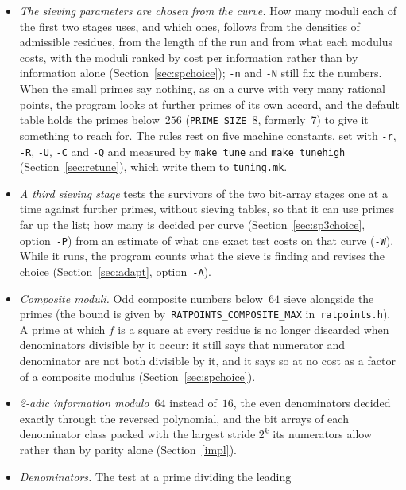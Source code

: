 \documentclass[12pt,a4paper,oneside]{amsart}
\begin{document}
\begin{itemize}
  \item \emph{The sieving parameters are chosen from the curve.} How many
        moduli each of the first two stages uses, and which ones, follows
        from the densities of admissible residues, from the length of the
        run and from what each modulus costs, with the moduli ranked by
        cost per information rather than by information alone
        (Section~\ref{sec:spchoice}); \verb+-n+ and \verb+-N+ still fix the
        numbers. When the small primes say nothing, as on a curve with very
        many rational points, the program looks at further primes of its
        own accord, and the default table holds the primes below~$256$
        (\texttt{PRIME\_SIZE}~8, formerly~7) to give it something to reach
        for. The rules rest on five machine constants, set with
        \verb+-r+, \verb+-R+, \verb+-U+, \verb+-C+ and \verb+-Q+ and
        measured by \texttt{make tune} and \texttt{make tunehigh}
        (Section~\ref{sec:retune}), which write them to \texttt{tuning.mk}.
  \item \emph{A third sieving stage} tests the survivors of the two
        bit-array stages one at a time against further primes, without
        sieving tables, so that it can use primes far up the list; how many
        is decided per curve (Section~\ref{sec:sp3choice}, option~\verb+-P+)
        from an estimate of what one exact test costs on that curve
        (\verb+-W+). While it runs, the program counts what the sieve is
        finding and revises the choice (Section~\ref{sec:adapt},
        option~\verb+-A+).
  \item \emph{Composite moduli.} Odd composite numbers below~$64$ sieve alongside
        the primes (the bound is given by~\texttt{RATPOINTS\_COMPOSITE\_MAX}
        in~\texttt{ratpoints.h}). A prime at which $f$ is a square at every
        residue is no longer discarded when denominators divisible by it
        occur: it still says that numerator and denominator are not both
        divisible by it, and it says so at no cost as a factor of a
        composite modulus (Section~\ref{sec:spchoice}).
  \item \emph{2-adic information modulo~$64$} instead of~$16$, the even
        denominators decided exactly through the reversed polynomial, and
        the bit arrays of each denominator class packed with the largest
        stride $2^k$ its numerators allow rather than by parity alone
        (Section~\ref{impl}).
  \item \emph{Denominators.} The test at a prime dividing the leading

\end{itemize}
\end{document}
